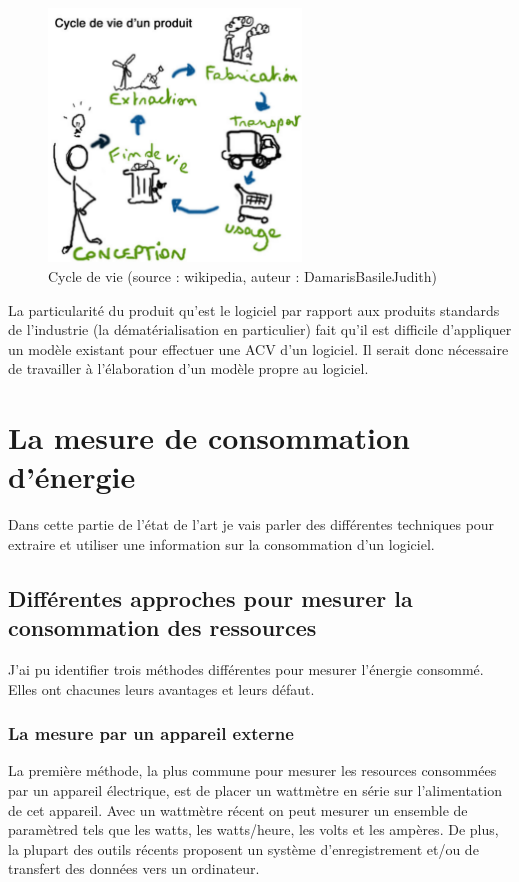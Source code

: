\documentclass[a4paper, 11pt]{report}
\begin{document}
\begin{figure}
	\centering
	\includegraphics[width=0.6\textwidth]{figures/Cycle-de-vie}
	\caption{Cycle de vie (source : wikipedia, auteur : DamarisBasileJudith)}
	\label{CdV}
\end{figure}

La particularité du produit qu'est le logiciel par rapport aux produits standards de l'industrie (la dématérialisation en particulier) fait qu'il est difficile d'appliquer un modèle existant pour effectuer une ACV d'un logiciel. Il serait donc nécessaire de travailler à l'élaboration d'un modèle propre au logiciel.
			\subsubsection{}
			
		
	\section{La mesure de consommation d'énergie}
Dans cette partie de l'état de l'art je vais parler des différentes techniques pour extraire et utiliser une information sur la consommation d'un logiciel.
		\subsection{Différentes approches pour mesurer la consommation des ressources}
J'ai pu identifier trois méthodes différentes pour mesurer l'énergie consommé. Elles ont chacunes leurs avantages et leurs défaut.
			\subsubsection{La mesure par un appareil externe}
La première méthode, la plus commune pour mesurer les resources consommées par un appareil électrique, est de placer un wattmètre en série sur l'alimentation de cet appareil. Avec un wattmètre récent on peut mesurer un ensemble de paramètred tels que les watts, les watts/heure, les volts et les ampères. De plus, la plupart des outils récents proposent un système d'enregistrement et/ou de transfert des données vers un ordinateur.
\end{document}
